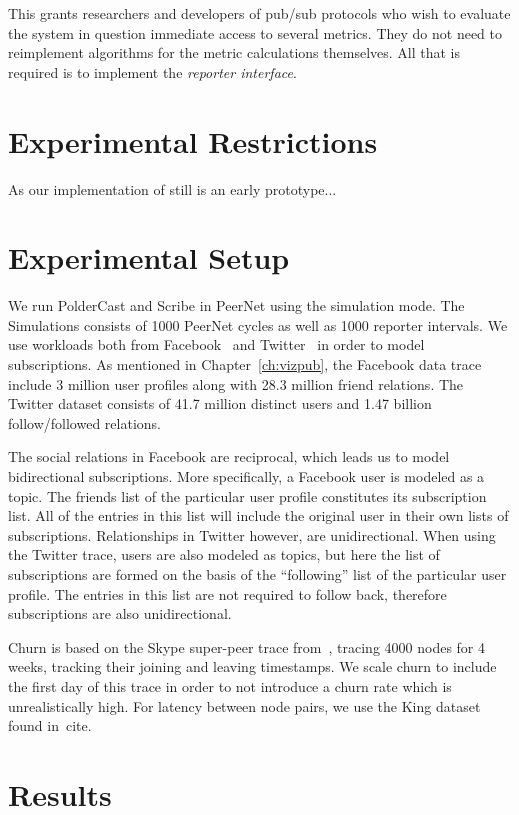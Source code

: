 This grants researchers and developers of pub/sub protocols who wish to evaluate
the system in question immediate access to several metrics. They do not need to
reimplement algorithms for the metric calculations themselves. All that is
required is to implement the \emph{reporter interface}.

\section{Experimental Restrictions}

As our implementation of \demo{} still is an early prototype...

\section{Experimental Setup}

We run PolderCast and Scribe in PeerNet using the simulation mode. The
Simulations consists of 1000 PeerNet cycles as well as 1000 reporter
intervals. We use workloads both from Facebook~\cite{} and
Twitter~\cite{} in order to model subscriptions. As mentioned in
Chapter~\ref{ch:vizpub}, the Facebook data trace include 3 million user
profiles along with 28.3 million friend relations. The Twitter dataset
consists of 41.7 million distinct users and 1.47 billion
follow/followed relations.

The social relations in Facebook are reciprocal, which leads us to model
bidirectional subscriptions. More specifically, a Facebook user is
modeled as a topic. The friends list of the particular user profile
constitutes its subscription list. All of the entries in this list will
include the original user in their own lists of subscriptions.
Relationships in Twitter however, are unidirectional. When using the
Twitter trace, users are also modeled as topics, but here the list of
subscriptions are formed on the basis of the ``following'' list of the
particular  user profile. The entries in this list are not required to
follow back, therefore subscriptions are also unidirectional.

Churn is based on the Skype super-peer trace from~\cite{}, tracing 4000
nodes for 4 weeks, tracking their joining and leaving timestamps. We
scale churn to include the first day of this trace in order to not
introduce a churn rate which is unrealistically high. For latency
between node pairs, we use the King dataset found in~cite{}.


\section{Results}

